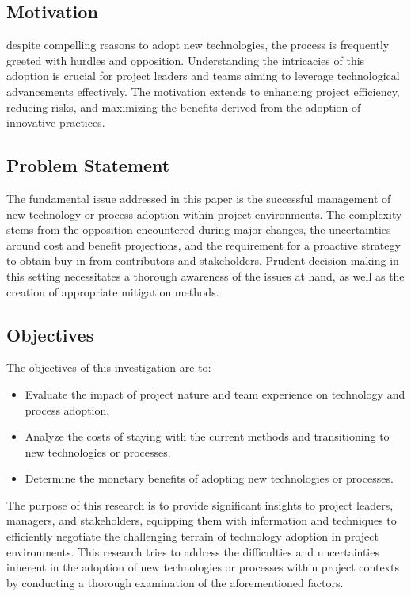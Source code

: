\documentclass{article}
\begin{document}
\subsection{Motivation}
despite compelling reasons to adopt new technologies, the process is frequently greeted with hurdles and opposition. Understanding the intricacies of this adoption is crucial for project leaders and teams aiming to leverage technological advancements effectively. The motivation extends to enhancing project efficiency, reducing risks, and maximizing the benefits derived from the adoption of innovative practices.

\subsection{Problem Statement}
The fundamental issue addressed in this paper is the successful management of new technology or process adoption within project environments. The complexity stems from the opposition encountered during major changes, the uncertainties around cost and benefit projections, and the requirement for a proactive strategy to obtain buy-in from contributors and stakeholders. Prudent decision-making in this setting necessitates a thorough awareness of the issues at hand, as well as the creation of appropriate mitigation methods.

\subsection{Objectives}
The objectives of this investigation are to:
\begin{itemize}
  \item Evaluate the impact of project nature and team experience on technology and process adoption.
  \item Analyze the costs of staying with the current methods and transitioning to new technologies or processes.
  \item Determine the monetary benefits of adopting new technologies or processes.
\end{itemize} The purpose of this research is to provide significant insights to project leaders, managers, and stakeholders, equipping them with information and techniques to efficiently negotiate the challenging terrain of technology adoption in project environments. This research tries to address the difficulties and uncertainties inherent in the adoption of new technologies or processes within project contexts by conducting a thorough examination of the aforementioned factors.
\end{document}

